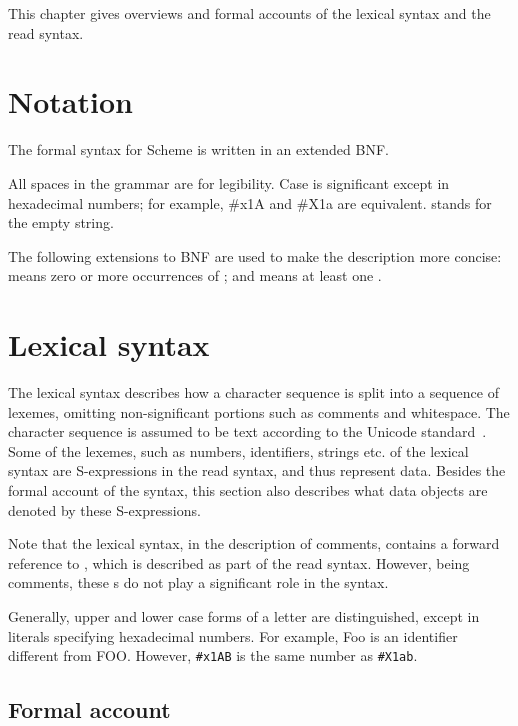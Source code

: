 This chapter gives overviews and formal accounts of the lexical
syntax and the read syntax.

\section{Notation}
\label{BNF}

The formal syntax for Scheme is written in an extended BNF.

All spaces in the grammar are for legibility.  Case is significant
except in hexadecimal numbers; for example, {\cf \#x1A} and {\cf
  \#X1a} are equivalent.   stands for the empty string.

The following extensions to BNF are used to make the description more
concise:   means zero or more occurrences of
; and  means at least one
.

\section{Lexical syntax}
\label{lexicalsyntaxsection}

The lexical syntax describes how a character sequence is split into a
sequence of lexemes, omitting non-significant portions
such as comments and whitespace.  The character sequence is assumed to
be text according to the Unicode standard~\cite{Unicode41}.  Some of
the lexemes, such as numbers, identifiers, strings etc. of the lexical
syntax are S-expressions in the read syntax, and thus represent data.
Besides the formal account of the syntax, this section also describes
what data objects are denoted by these S-expressions.

Note that the lexical syntax, in the description of comments, contains
a forward reference to , which is described as part of the
read syntax.  However, being comments, these s do not play
a significant role in the syntax.

Generally, upper and lower case forms of a letter are distinguished,
except in literals specifying hexadecimal numbers.  For example, {\cf
  Foo} is an identifier different from {\cf FOO}.  However,
{\tt\#x1AB} is the same number as {\tt\#X1ab}.

\subsection{Formal account}
\label{lexicalgrammarsection}

